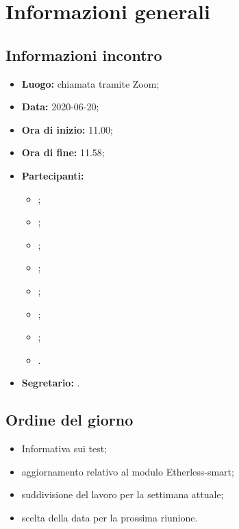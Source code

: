 \section{Informazioni generali}
\subsection{Informazioni incontro}
\begin{itemize}
	\item \textbf{Luogo:} chiamata tramite Zoom;
	\item \textbf{Data:} 2020-06-20;
	\item \textbf{Ora di inizio:} 11.00;
	\item \textbf{Ora di fine:} 11.58;
	\item \textbf{Partecipanti:}
		\begin{itemize}
			\item \VB;
			\item \LB;
			\item \NF;
			\item \EG;
			\item \FJ;
			\item \MP;
			\item \AS;
			\item \AZ.
		\end{itemize}
	\item \textbf{Segretario:} \NF.
\end{itemize}

\subsection{Ordine del giorno}
\begin{itemize}
	\item Informativa sui test;
	\item aggiornamento relativo al modulo Etherless-smart;
	\item suddivisione del lavoro per la settimana attuale;
	\item scelta della data per la prossima riunione.
\end{itemize}
